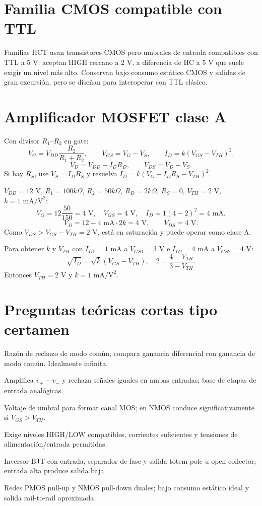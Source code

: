 \documentclass[11pt,letterpaper]{article}
\begin{document}
\section{Familia CMOS compatible con TTL}
Familias HCT usan transistores CMOS pero umbrales de entrada compatibles con TTL a 5 V: aceptan HIGH cercano a 2 V, a diferencia de HC a 5 V que suele exigir un nivel más alto. Conservan bajo consumo estático CMOS y salidas de gran excursión, pero se diseñan para interoperar con TTL clásico.

\section{Amplificador MOSFET clase A}
Con divisor $R_1$--$R_2$ en gate:
\[V_G=V_{DD}\frac{R_2}{R_1+R_2},\qquad V_{GS}=V_G-V_S,\qquad I_D=k(V_{GS}-V_{TH})^2.\]
\[V_D=V_{DD}-I_DR_D,\qquad V_{DS}=V_D-V_S.\]
Si hay $R_S$, use $V_S=I_DR_S$ y resuelva $I_D=k(V_G-I_DR_S-V_{TH})^2$.
\begin{ejemplo}
$V_{DD}=12$ V, $R_1=100k\Omega$, $R_2=50k\Omega$, $R_D=2k\Omega$, $R_S=0$, $V_{TH}=2$ V, $k=1\text{ mA/V}^2$:
\[V_G=12\frac{50}{150}=4\text{ V},\quad V_{GS}=4\text{ V},\quad I_D=1(4-2)^2=4\text{ mA}.\]
\[V_D=12-4\text{ mA}\cdot2k=4\text{ V},\qquad V_{DS}=4\text{ V}.\]
Como $V_{DS}>V_{GS}-V_{TH}=2$ V, está en saturación y puede operar como clase A.
\end{ejemplo}
\begin{ejemplo}
Para obtener $k$ y $V_{TH}$ con $I_{D1}=1$ mA a $V_{GS1}=3$ V e $I_{D2}=4$ mA a $V_{GS2}=4$ V:
\[\sqrt{I_D}=\sqrt{k}(V_{GS}-V_{TH}),\quad 2=\frac{4-V_{TH}}{3-V_{TH}}.\]
Entonces $V_{TH}=2$ V y $k=1\text{ mA/V}^2$.
\end{ejemplo}

\section{Preguntas teóricas cortas tipo certamen}
\begin{description}[leftmargin=2.9cm,style=nextline]
\item[CMRR] Razón de rechazo de modo común; compara ganancia diferencial con ganancia de modo común. Idealmente infinita.
\item[Amplificador diferencial] Amplifica $v_+-v_-$ y rechaza señales iguales en ambas entradas; base de etapas de entrada analógicas.
\item[Threshold voltage] Voltaje de umbral para formar canal MOS; en NMOS conduce significativamente si $V_{GS}>V_{TH}$.
\item[Compatibilidad TTL--CMOS] Exige niveles HIGH/LOW compatibles, corrientes suficientes y tensiones de alimentación/entrada permitidas.
\item[Inversor TTL] Inversor BJT con entrada, separador de fase y salida totem pole u open collector; entrada alta produce salida baja.
\item[Compuertas CMOS] Redes PMOS pull-up y NMOS pull-down duales; bajo consumo estático ideal y salida rail-to-rail aproximada.
\end{description}
\end{document}
